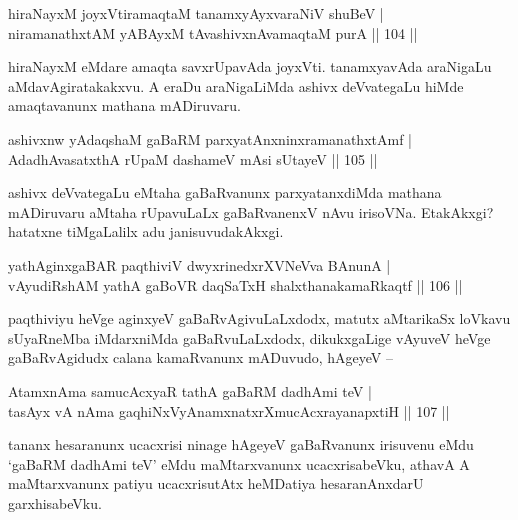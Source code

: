 
\begin{shl}
hiraNayxM joyxVtiramaqtaM tanamxyAyxvaraNiV shuBeV | \\
niramanathxtAM yABAyxM tAvashivxnAvamaqtaM purA \hfill|| 104 || 
\end{shl}

\begin{artha}
hiraNayxM eMdare amaqta savxrUpavAda joyxVti. tanamxyavAda araNigaLu 
aMdavAgiratakakxvu. A eraDu araNigaLiMda ashivx deVvategaLu hiMde 
amaqtavanunx mathana mADiruvaru.
\end{artha}

\begin{shl}
ashivxnw yAdaqshaM gaBaRM parxyatAnxninxramanathxtAmf | \\
AdadhAvasatxthA rUpaM dashameV mAsi sUtayeV \hfill|| 105 || 
\end{shl}

\begin{artha}
ashivx deVvategaLu eMtaha gaBaRvanunx parxyatanxdiMda mathana 
mADiruvaru aMtaha rUpavuLaLx gaBaRvanenxV nAvu irisoVNa. EtakAkxgi? 
hatatxne tiMgaLalilx adu janisuvudakAkxgi.
\end{artha}


\begin{shl}
yathA\s ginxgaBAR paqthiviV dwyxrinedxrXVNeVva BAnunA | \\
vAyudiRshAM yathA gaBoVR daqSaTxH shalxthanakamaRkaqtf \hfill|| 106 || 
\end{shl}

\begin{artha}
paqthiviyu heVge aginxyeV gaBaRvAgivuLaLxdodx, matutx aMtarikaSx 
loVkavu \-sUyaRneMba iMdarxniMda gaBaRvuLaLxdodx, dikukxgaLige vAyuveV
heVge gaBaR\-vAgidudx calana kamaRvanunx mADuvudo, hAgeyeV --
\end{artha}


\begin{shl}
AtamxnAma samucAcxyaR tathA gaBaRM dadhAmi teV | \\
tasAyx vA nAma gaqhiNxVyAnamxnatxrXmucAcxrayanapxtiH \hfill|| 107 ||  
\end{shl}

\begin{artha}
tananx hesaranunx ucacxrisi ninage hAgeyeV gaBaRvanunx irisuvenu eMdu 
`gaBaRM dadhAmi teV' eMdu maMtarxvanunx ucacxrisabeVku, athavA A 
maMtarxvanunx patiyu ucacxrisutAtx heMDatiya hesaranAnxdarU 
garxhisabeVku.
\end{artha}

